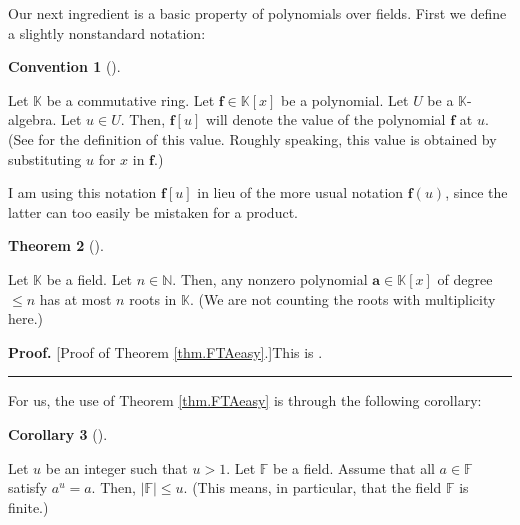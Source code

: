 \documentclass[numbers=enddot,12pt,final,onecolumn,notitlepage]{scrartcl}%
\theoremstyle{definition}
\newtheorem{theo}{Theorem}[subsection]
\newenvironment{theorem}[1][]
{\begin{theo}[#1]\begin{leftbar}}
{\end{leftbar}\end{theo}}
\newtheorem{coro}[theo]{Corollary}
\newenvironment{corollary}[1][]
{\begin{coro}[#1]\begin{leftbar}}
{\end{leftbar}\end{coro}}
\newtheorem{conv}[theo]{Convention}
\newenvironment{convention}[1][]
{\begin{conv}[#1]\begin{leftbar}}
{\end{leftbar}\end{conv}}
\newenvironment{proof}[1][Proof]{\noindent\textbf{#1.} }{\ \rule{0.5em}{0.5em}}
\begin{document}
Our next ingredient is a basic property of polynomials over fields. First we
define a slightly nonstandard notation:

\begin{convention}
Let $\mathbb{K}$ be a commutative ring. Let $\mathbf{f}\in\mathbb{K}\left[
x\right]  $ be a polynomial. Let $U$ be a $\mathbb{K}$-algebra. Let $u\in U$.
Then, $\mathbf{f}\left[  u\right]  $ will denote the value of the polynomial
$\mathbf{f}$ at $u$. (See \cite[Definition 7.6.1]{19s} for the definition of
this value. Roughly speaking, this value is obtained by substituting $u$ for
$x$ in $\mathbf{f}$.)
\end{convention}

I am using this notation $\mathbf{f}\left[  u\right]  $ in lieu of the more
usual notation $\mathbf{f}\left(  u\right)  $, since the latter can too easily
be mistaken for a product.

\begin{theorem}
\label{thm.FTAeasy}Let $\mathbb{K}$ be a field. Let $n\in\mathbb{N}$. Then,
any nonzero polynomial $\mathbf{a}\in\mathbb{K}\left[  x\right]  $ of degree
$\leq n$ has at most $n$ roots in $\mathbb{K}$. (We are not counting the roots
with multiplicity here.)
\end{theorem}

\begin{proof}
[Proof of Theorem \ref{thm.FTAeasy}.]This is \cite[Theorem 7.6.11]{19s}.
\end{proof}

For us, the use of Theorem \ref{thm.FTAeasy} is through the following corollary:

\begin{corollary}
\label{cor.inverse-field-FLT}Let $u$ be an integer such that $u>1$. Let
$\mathbb{F}$ be a field. Assume that all $a\in\mathbb{F}$ satisfy $a^{u}=a$.
Then, $\left\vert \mathbb{F}\right\vert \leq u$. (This means, in particular,
that the field $\mathbb{F}$ is finite.)
\end{corollary}
\end{document}

